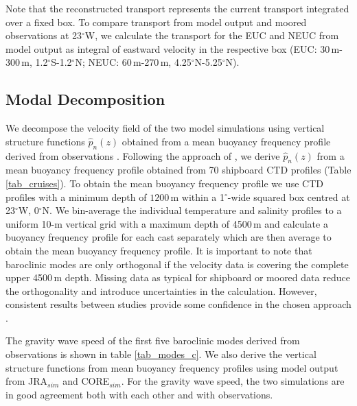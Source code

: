 \documentclass[os, manuscript]{copernicus}
\begin{document}
	Note that the reconstructed transport represents the current transport integrated over a fixed box. To compare transport from model output and moored observations at 23$^{\circ}$W, we calculate the transport for the EUC and NEUC from model output as integral of eastward velocity in the respective box (EUC: 30$\,$m-300$\,$m, 1.2$^{\circ}$S-1.2$^{\circ}$N; NEUC: 60$\,$m-270$\,$m, 4.25$^{\circ}$N-5.25$^{\circ}$N). 
	
	
	\subsection{Modal Decomposition}
	We decompose the velocity field of the two model simulations using vertical structure functions $ \hat{p}_n(z) $ obtained from a mean buoyancy frequency profile derived from observations \citep{Brandt2016}. Following the approach of \cite{Claus2016a}, we derive $ \hat{p}_n(z) $ from a mean buoyancy frequency profile obtained from 70 shipboard CTD profiles (Table \ref{tab_cruises}). To obtain the mean buoyancy frequency profile we use CTD profiles with a minimum depth of $ 1200\, $m within a 1$^{\circ}$-wide squared box centred at 23$^{\circ}$W, 0$^{\circ}$N. We bin-average the individual temperature and salinity profiles to a uniform 10-m vertical grid with a maximum depth of 4500$\,$m and calculate a buoyancy frequency profile for each cast separately which are then average to obtain the mean buoyancy frequency profile. It is important to note that baroclinic modes are only orthogonal if the velocity data is covering the complete upper 4500$\,$m depth. Missing data as typical for shipboard or moored data reduce the orthogonality and introduce uncertainties in the calculation. However, consistent results between studies provide some confidence in the chosen approach \citep[e.g. ][]{Brandt2016, Claus2016a, Kopte2018}.
	
	The gravity wave speed of the first five baroclinic modes derived from observations is shown in table \ref{tab_modes_c}. We also derive the vertical structure functions from mean buoyancy frequency profiles using model output from JRA$_{sim}$ and CORE$_{sim}$. For the gravity wave speed, the two simulations are in good agreement both with each other and with observations.
	
\end{document}

